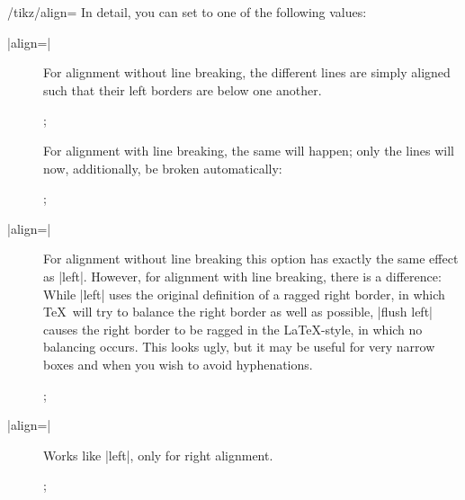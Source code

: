 \begin{key}{/tikz/align=}
    In detail, you can set  to one of the following values:
    \begin{description}
        \item[|align=|] For alignment without line breaking,
            the different lines are simply aligned such that their left borders
            are below one another.
\begin{codeexample}[]
\tikz {};
\end{codeexample}
            For alignment with line breaking, the same will happen; only the
            lines will now, additionally, be broken automatically:
\begin{codeexample}[]
\tikz {};
\end{codeexample}
        \item[|align=|] For alignment without line
            breaking this option has exactly the same effect as |left|.
            However, for alignment with line breaking, there is a difference:
            While |left| uses the original  definition of a ragged
            right border, in which \TeX\ will try to balance the right border
            as well as possible, |flush left| causes the right border to be
            ragged in the \LaTeX-style, in which no balancing occurs. This
            looks ugly, but it may be useful for very narrow boxes and when you
            wish to avoid hyphenations.
\begin{codeexample}[]
\tikz {};
\end{codeexample}
        \item[|align=|] Works like |left|, only for right
            alignment.
\begin{codeexample}[]
\tikz {};
\end{codeexample}
\begin{codeexample}[]

\end{codeexample}
\end{description}
\end{key}
